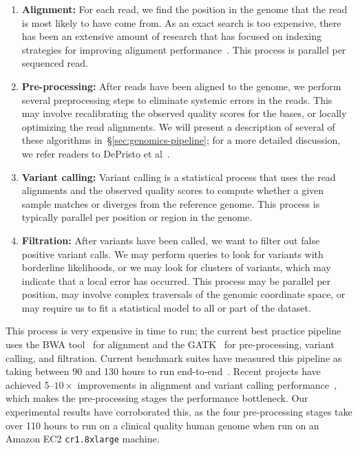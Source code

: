 \documentclass[masters]{ucbthesis}
\begin{document}
\begin{enumerate}
\item \textbf{Alignment:} For each read, we find the position in the genome that the read is most likely to
have come from. As an exact search is too expensive, there has been an extensive amount of research
that has focused on indexing strategies for improving alignment performance~\cite{li10, li11wham,
zaharia11}. This process is parallel per sequenced read.
\item \textbf{Pre-processing:} After reads have been aligned to the genome, we perform several
preprocessing steps to eliminate systemic errors in the reads. This may involve recalibrating the
observed quality scores for the bases, or locally optimizing the read alignments. We will present a
description of several of these algorithms in~\S\ref{sec:genomics-pipeline}; for a more detailed
discussion, we refer readers to DePristo et al~\cite{depristo11}.
\item \textbf{Variant calling:} Variant calling is a statistical process that uses the read alignments
and the observed quality scores to compute whether a given sample matches or diverges
from the reference genome. This process is typically parallel per position or region in the genome.
\item \textbf{Filtration:} After variants have been called, we want to filter out false positive variant calls.
We may perform queries to look for variants with borderline likelihoods, or we may look for clusters of
variants, which may indicate that a local error has occurred. This process may be parallel per position,
may involve complex traversals of the genomic coordinate space, or may require us to fit a statistical
model to all or part of the dataset.
\end{enumerate}

This process is very expensive in time to run; the current best practice pipeline uses the BWA
tool~\cite{li10} for alignment and the GATK~\cite{depristo11, mckenna10} for pre-processing, variant
calling, and filtration. Current benchmark suites have measured this pipeline as taking between 90 and
130 hours to run end-to-end~\cite{talwalkar14}. Recent projects have achieved 5--$10\times$
improvements in alignment and variant calling performance~\cite{rimmer14, zaharia11}, which makes the
pre-processing stages the performance bottleneck. Our experimental results have corroborated this, as
the four pre-processing stages take over 110 hours to run on a clinical quality human genome when run
on an Amazon EC2 \texttt{cr1.8xlarge} machine. 
\end{document}
